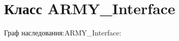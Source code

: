 \hypertarget{classARMY__Interface}{}\section{Класс A\+R\+M\+Y\+\_\+\+Interface}
\label{classARMY__Interface}


Граф наследования\+:A\+R\+M\+Y\+\_\+\+Interface\+:

